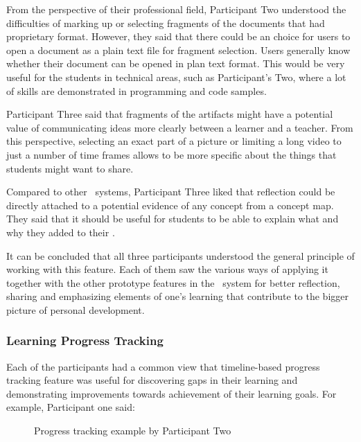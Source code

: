 From the perspective of their professional field, Participant Two understood the
difficulties of marking up or selecting fragments of the documents that had
proprietary format. However, they said that there could be an choice for users
to open a document as a plain text file for fragment selection. Users generally
know whether their document can be opened in plan text format. This would be
very useful for the students in technical areas, such as Participant's Two,
where a lot of skills are demonstrated in programming and code samples.

Participant Three said that fragments of the artifacts might have a potential
value of communicating ideas more clearly between a learner and a teacher.
From this perspective, selecting an exact part of a picture or limiting a long
video to just a number of time frames allows to be more specific about the
things that students might want to share.

Compared to other \ep~systems, Participant Three liked that reflection could be
directly attached to a potential evidence of any concept from a concept map.
They said that it should be useful for students to be able to explain what and
why they added to their \ep.

It can be concluded that all three participants understood the general principle
of working with this feature. Each of them saw the various ways of applying it
together with the other prototype features in the \ep~system for better
reflection, sharing and emphasizing elements of one's learning that contribute
to the bigger picture of personal development.

\subsubsection{Learning Progress Tracking}

Each of the participants had a common view that timeline-based progress tracking
feature was useful for discovering gaps in their learning and demonstrating
improvements towards achievement of their learning goals. For example,
Participant one said:


\begin{figure}[htb]
\centering
\setlength\fboxsep{0pt}
\setlength\fboxrule{0.5pt}
\caption{Progress tracking example by Participant Two}
\label{fig:p2timeline}
\end{figure}


